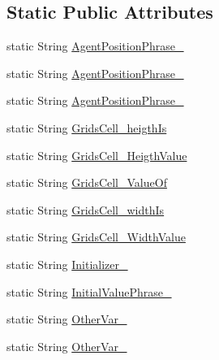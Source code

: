 \subsection*{Static Public Attributes}
\begin{DoxyCompactItemize}
\item 
static String \hyperlink{classit_1_1isislab_1_1masonhelperdocumentation_1_1mason_1_1wizards_1_1_messages_a62c64cabbbca9c52e530038f6f979465}{Agent\-Position\-Phrase\-\_}
\item 
static String \hyperlink{classit_1_1isislab_1_1masonhelperdocumentation_1_1mason_1_1wizards_1_1_messages_a9073b9a78e29a6a2070306ea86c9fb5c}{Agent\-Position\-Phrase\-\_}
\item 
static String \hyperlink{classit_1_1isislab_1_1masonhelperdocumentation_1_1mason_1_1wizards_1_1_messages_a71ecf184dba867ae350d6ca94c4ddc6b}{Agent\-Position\-Phrase\-\_}
\item 
static String \hyperlink{classit_1_1isislab_1_1masonhelperdocumentation_1_1mason_1_1wizards_1_1_messages_ac21665599041715753483d61a28432cf}{Grids\-Cell\-\_\-heigth\-Is}
\item 
static String \hyperlink{classit_1_1isislab_1_1masonhelperdocumentation_1_1mason_1_1wizards_1_1_messages_a7f4f2c91f12e42810f94ac6ebe6c9f54}{Grids\-Cell\-\_\-\-Heigth\-Value}
\item 
static String \hyperlink{classit_1_1isislab_1_1masonhelperdocumentation_1_1mason_1_1wizards_1_1_messages_a13a927e8a06359bbe1f88790f95fcc5e}{Grids\-Cell\-\_\-\-Value\-Of}
\item 
static String \hyperlink{classit_1_1isislab_1_1masonhelperdocumentation_1_1mason_1_1wizards_1_1_messages_ad864daaa048d3b73679f30e24c93bf4c}{Grids\-Cell\-\_\-width\-Is}
\item 
static String \hyperlink{classit_1_1isislab_1_1masonhelperdocumentation_1_1mason_1_1wizards_1_1_messages_a6826789d097ceed8fd62fed150e484c0}{Grids\-Cell\-\_\-\-Width\-Value}
\item 
static String \hyperlink{classit_1_1isislab_1_1masonhelperdocumentation_1_1mason_1_1wizards_1_1_messages_a6e2164764a391a1170eb3a531bf8a30f}{Initializer\-\_}
\item 
static String \hyperlink{classit_1_1isislab_1_1masonhelperdocumentation_1_1mason_1_1wizards_1_1_messages_a7a1318f8e98dac2c10e61a75eb494f27}{Initial\-Value\-Phrase\-\_}
\item 
static String \hyperlink{classit_1_1isislab_1_1masonhelperdocumentation_1_1mason_1_1wizards_1_1_messages_a74705c5328fba20699a38bc26bad085b}{Other\-Var\-\_}
\item 
static String \hyperlink{classit_1_1isislab_1_1masonhelperdocumentation_1_1mason_1_1wizards_1_1_messages_acb3db6a7e2ad9401ad4b036a383507b1}{Other\-Var\-\_}
\end{DoxyCompactItemize}
